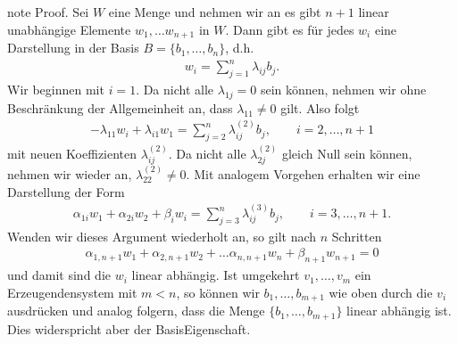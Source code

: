 \documentclass[letterpaper,10pt,english]{jupyterBook}
\begin{document}
\begin{sphinxadmonition}{note}
Proof.  Sei \(W\) eine  Menge und nehmen wir an es gibt \(n+1\) linear unabhängige Elemente \(w_1, \ldots w_{n+1}\) in \(W\). Dann gibt es für jedes \(w_i\) eine Darstellung in der Basis \(B=\{b_1,\ldots,b_n\}\), d.h.
\begin{equation*}
\begin{split} w_i =  \sum_{j=1}^n \lambda_{ij} b_j.\end{split}
\end{equation*}
Wir beginnen mit \(i=1\). Da nicht alle \(\lambda_{1j} =0 \) sein können, nehmen wir ohne Beschränkung der Allgemeinheit an, dass \(\lambda_{11} \neq 0\) gilt. Also folgt
\begin{equation*}
\begin{split} - \lambda_{11} w_i + \lambda_{i1} w_1 = \sum_{j=2}^n \lambda_{ij}^{(2)}  b_j, \qquad i=2,\ldots,n+1\end{split}
\end{equation*}
mit neuen Koeffizienten \(\lambda_{ij}^{(2)}\). Da nicht alle \(\lambda_{2j}^{(2)} \) gleich Null sein können, nehmen wir wieder an, \(\lambda_{22}^{(2)} \neq 0\). Mit analogem Vorgehen erhalten wir eine Darstellung der Form
\begin{equation*}
\begin{split} \alpha_{1i} w_1 + \alpha_{2i} w_2 + \beta_i w_i = \sum_{j=3}^n \lambda_{ij}^{(3)}  b_j, \qquad i=3,\ldots,n+1.\end{split}
\end{equation*}
Wenden wir dieses Argument wiederholt an, so gilt nach \(n\) Schritten
\begin{equation*}
\begin{split} \alpha_{1,n+1} w_1 + \alpha_{2,n+1} w_2 + \ldots \alpha_{n,n+1} w_n + \beta_{n+1} w_{n+1} = 0\end{split}
\end{equation*}
und damit sind die \(w_i\) linear abhängig.
Ist umgekehrt \(v_1, \ldots, v_m\) ein Erzeugendensystem mit \(m<n\), so können wir \(b_1,\ldots,b_{m+1}\) wie oben durch die \(v_i\) ausdrücken und analog folgern, dass die Menge \(\{b_1,\ldots,b_{m+1}\}\) linear abhängig ist. Dies widerspricht aber der Basis\sphinxhyphen{}Eigenschaft.
\end{sphinxadmonition}
\end{document}
